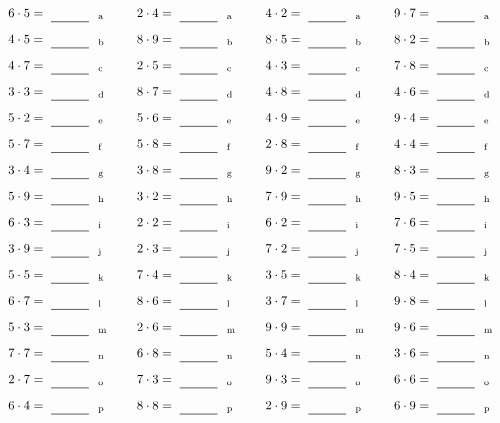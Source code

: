 \documentclass
[
  draft    = true,
  fontsize = 11pt,
  parskip  = half-
]
{scrartcl}
\begin{document}
\par\vfill\par
\begin{align*}
    \pline{6\cdot5}&=\rline{a}
  & \pline{2\cdot4}&=\rline{a}
  & \pline{4\cdot2}&=\rline{a}
  & \pline{9\cdot7}&=\rline{a} \\[1ex]
    \pline{4\cdot5}&=\rline{b}
  & \pline{8\cdot9}&=\rline{b}
  & \pline{8\cdot5}&=\rline{b}
  & \pline{8\cdot2}&=\rline{b} \\[1ex]
    \pline{4\cdot7}&=\rline{c}
  & \pline{2\cdot5}&=\rline{c}
  & \pline{4\cdot3}&=\rline{c}
  & \pline{7\cdot8}&=\rline{c} \\[1ex]
    \pline{3\cdot3}&=\rline{d}
  & \pline{8\cdot7}&=\rline{d}
  & \pline{4\cdot8}&=\rline{d}
  & \pline{4\cdot6}&=\rline{d} \\[1ex]
    \pline{5\cdot2}&=\rline{e}
  & \pline{5\cdot6}&=\rline{e}
  & \pline{4\cdot9}&=\rline{e}
  & \pline{9\cdot4}&=\rline{e} \\[1ex]
    \pline{5\cdot7}&=\rline{f}
  & \pline{5\cdot8}&=\rline{f}
  & \pline{2\cdot8}&=\rline{f}
  & \pline{4\cdot4}&=\rline{f} \\[1ex]
    \pline{3\cdot4}&=\rline{g}
  & \pline{3\cdot8}&=\rline{g}
  & \pline{9\cdot2}&=\rline{g}
  & \pline{8\cdot3}&=\rline{g} \\[1ex]
    \pline{5\cdot9}&=\rline{h}
  & \pline{3\cdot2}&=\rline{h}
  & \pline{7\cdot9}&=\rline{h}
  & \pline{9\cdot5}&=\rline{h} \\[1ex]
    \pline{6\cdot3}&=\rline{i}
  & \pline{2\cdot2}&=\rline{i}
  & \pline{6\cdot2}&=\rline{i}
  & \pline{7\cdot6}&=\rline{i} \\[1ex]
    \pline{3\cdot9}&=\rline{j}
  & \pline{2\cdot3}&=\rline{j}
  & \pline{7\cdot2}&=\rline{j}
  & \pline{7\cdot5}&=\rline{j} \\[1ex]
    \pline{5\cdot5}&=\rline{k}
  & \pline{7\cdot4}&=\rline{k}
  & \pline{3\cdot5}&=\rline{k}
  & \pline{8\cdot4}&=\rline{k} \\[1ex]
    \pline{6\cdot7}&=\rline{l}
  & \pline{8\cdot6}&=\rline{l}
  & \pline{3\cdot7}&=\rline{l}
  & \pline{9\cdot8}&=\rline{l} \\[1ex]
    \pline{5\cdot3}&=\rline{m}
  & \pline{2\cdot6}&=\rline{m}
  & \pline{9\cdot9}&=\rline{m}
  & \pline{9\cdot6}&=\rline{m} \\[1ex]
    \pline{7\cdot7}&=\rline{n}
  & \pline{6\cdot8}&=\rline{n}
  & \pline{5\cdot4}&=\rline{n}
  & \pline{3\cdot6}&=\rline{n} \\[1ex]
    \pline{2\cdot7}&=\rline{o}
  & \pline{7\cdot3}&=\rline{o}
  & \pline{9\cdot3}&=\rline{o}
  & \pline{6\cdot6}&=\rline{o} \\[1ex]
    \pline{6\cdot4}&=\rline{p}
  & \pline{8\cdot8}&=\rline{p}
  & \pline{2\cdot9}&=\rline{p}
  & \pline{6\cdot9}&=\rline{p}
\end{align*}
\end{document}
